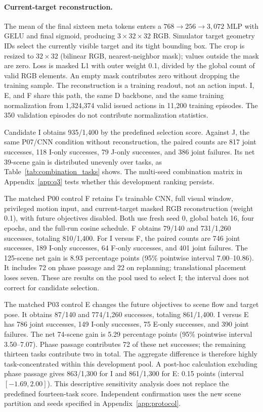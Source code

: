\paragraph{Current-target reconstruction.}
The mean of the final sixteen meta tokens enters a
$768\to256\to3,072$ MLP with GELU and final sigmoid, producing
$3\times32\times32$ RGB. Simulator target geometry IDs select the
currently visible target and its tight bounding box. The crop is resized
to $32\times32$ (bilinear RGB, nearest-neighbor mask); values outside
the mask are zero. Loss is masked L1 with outer weight 0.1,
divided by the global count of valid RGB elements.
An empty mask contributes zero without dropping the training sample.
The reconstruction is a training readout, not an action input.
I, E, and F share this path, the same D backbone, and the same training
normalization from 1,324,374 valid issued actions in 11,200 training episodes.
The 350 validation episodes do not contribute normalization statistics.

Candidate I obtains 935/1,400 by the predefined selection score.
Against J, the same P07/CNN condition without reconstruction, the paired
counts are 817 joint successes, 118 I-only successes, 79 J-only successes,
and 386 joint failures. Its net 39-scene gain is distributed unevenly
over tasks, as Table~\ref{tab:combination_tasks} shows.
The multi-seed combination matrix in Appendix~\ref{app:q3} tests whether
this development ranking persists.

The matched P00 control F retains I's trainable CNN, full visual window,
privileged motion input, and current-target masked RGB reconstruction
(weight 0.1), with future objectives disabled. Both use fresh seed 0,
global batch 16, four epochs, and the full-run cosine schedule.
F obtains 79/140 and 731/1,260 successes, totaling 810/1,400.
For I versus F, the paired counts are 746 joint successes, 189 I-only
successes, 64 F-only successes, and 401 joint failures.
The 125-scene net gain is 8.93 percentage points (95\% pointwise interval
7.00--10.86). It includes 72 on phase passage and 22 on replanning;
translational placement loses seven. These are results on the pool used to
select I; the interval does not correct for candidate selection.

The matched P03 control E changes the future objectives to scene flow and
target pose. It obtains 87/140 and 774/1,260 successes, totaling 861/1,400.
I versus E has 786 joint successes, 149 I-only successes, 75 E-only successes,
and 390 joint failures. The net 74-scene gain is 5.29 percentage points
(95\% pointwise interval 3.50--7.07).
Phase passage contributes 72 of these net successes; the remaining thirteen
tasks contribute two in total. The aggregate difference is therefore highly
task-concentrated within this development pool. A post-hoc calculation excluding
phase passage gives 863/1,300 for I and 861/1,300 for E: 0.15 points
(interval $[-1.69,2.00]$). This descriptive sensitivity analysis does not
replace the predefined fourteen-task score. Independent confirmation uses
the new scene partition and seeds specified in Appendix~\ref{app:protocol}.

